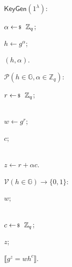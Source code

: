 \documentclass[../../book.tex]{subfiles}
\begin{document}
\begin{algoproto}[h]
    \small
    \centering
    \begin{mdframed}[linecolor=black, linewidth=1pt,
                     skipabove=10pt, skipbelow=10pt,
                     innerleftmargin=5pt, innerrightmargin=5pt]
        \begin{minipage}[t]{0.28\linewidth}
            \colorbox{oc-blue-1}{$\mathsf{KeyGen}(1^{\lambda})$:}
            \begin{algoen}
                \item $\alpha \leftarrowS \mathbb{Z}_q$;
                \item $h \gets g^{\alpha}$;
                \item {} $(h, \alpha)$.
            \end{algoen}
        \end{minipage}
        \hfill
        \begin{minipage}[t]{0.33\linewidth}
            \colorbox{oc-blue-1}{$\mathcal{P}(h \in \mathbb{G}, \alpha \in \mathbb{Z}_q)$:}
            \begin{algoen}
                \item $r \leftarrowS \mathbb{Z}_q$;
                \item {} \\  $w \gets g^r$;
                \item {} $c$;
                \item {} \\  $z \gets r + \alpha c$.
            \end{algoen}
        \end{minipage}
        \hfill
        \begin{minipage}[t]{0.33\linewidth}
            \colorbox{oc-blue-1}{$\mathcal{V}(h \in \mathbb{G}) \to \{0,1\}$:}
            \begin{algoen}
                \item {} $w$;
                \item {} \\  $c \leftarrowS \mathbb{Z}_q$;
                \item {} $z$;
                \item {} $\llbracket g^z = wh^c \rrbracket$.
            \end{algoen}
        \end{minipage}
    \end{mdframed}
    \caption{The Schnorr identification protocol.}
    \label{fig:schnorr-id}
\end{algoproto}
\end{document}
